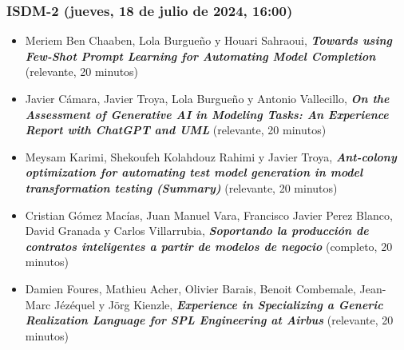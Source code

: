 \begin{frame}
  \frametitle{ISDM-2 (jueves, 18 de julio de 2024, 16:00)}
\begin{itemize}

\item \small{Meriem Ben Chaaben, Lola Burgueño y Houari Sahraoui}, %
      {\bfseries\itshape Towards using Few-Shot Prompt Learning for Automating Model Completion} %
      \small{(relevante, 20 minutos)}

\item \small{Javier Cámara, Javier Troya, Lola Burgueño y Antonio Vallecillo}, %
      {\bfseries\itshape On the Assessment of Generative AI in Modeling Tasks: An Experience Report with ChatGPT and UML} %
      \small{(relevante, 20 minutos)}

\item \small{Meysam Karimi, Shekoufeh Kolahdouz Rahimi y Javier Troya}, %
      {\bfseries\itshape Ant-colony optimization for automating test model generation in model transformation testing (Summary)} %
      \small{(relevante, 20 minutos)}

\item \small{Cristian Gómez Macías, Juan Manuel Vara, Francisco Javier Perez Blanco, David Granada y Carlos Villarrubia}, %
      {\bfseries\itshape Soportando la producción de contratos inteligentes a partir de modelos de negocio} %
      \small{(completo, 20 minutos)}

\item \small{Damien Foures, Mathieu Acher, Olivier Barais, Benoit Combemale, Jean-Marc Jézéquel y Jörg Kienzle}, %
      {\bfseries\itshape Experience in Specializing a Generic Realization Language for SPL Engineering at Airbus} %
      \small{(relevante, 20 minutos)}

\end{itemize}
\end{frame}